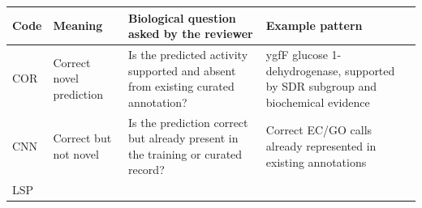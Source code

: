 \documentclass[
  11pt,
]{article}
\begin{document}
\begin{longtable}[]{@{}llll@{}}
\toprule
\begin{minipage}[b]{0.22\columnwidth}\raggedright
Code\strut
\end{minipage} & \begin{minipage}[b]{0.22\columnwidth}\raggedright
Meaning\strut
\end{minipage} & \begin{minipage}[b]{0.22\columnwidth}\raggedright
Biological question asked by the reviewer\strut
\end{minipage} & \begin{minipage}[b]{0.22\columnwidth}\raggedright
Example pattern\strut
\end{minipage}\tabularnewline
\midrule
\endhead
\begin{minipage}[t]{0.22\columnwidth}\raggedright
COR\strut
\end{minipage} & \begin{minipage}[t]{0.22\columnwidth}\raggedright
Correct novel prediction\strut
\end{minipage} & \begin{minipage}[t]{0.22\columnwidth}\raggedright
Is the predicted activity supported and absent from existing curated
annotation?\strut
\end{minipage} & \begin{minipage}[t]{0.22\columnwidth}\raggedright
ygfF glucose 1-dehydrogenase, supported by SDR subgroup and biochemical
evidence\strut
\end{minipage}\tabularnewline
\begin{minipage}[t]{0.22\columnwidth}\raggedright
CNN\strut
\end{minipage} & \begin{minipage}[t]{0.22\columnwidth}\raggedright
Correct but not novel\strut
\end{minipage} & \begin{minipage}[t]{0.22\columnwidth}\raggedright
Is the prediction correct but already present in the training or curated
record?\strut
\end{minipage} & \begin{minipage}[t]{0.22\columnwidth}\raggedright
Correct EC/GO calls already represented in existing annotations\strut
\end{minipage}\tabularnewline
\begin{minipage}[t]{0.22\columnwidth}\raggedright
LSP\strut
\end{minipage} & \begin{minipage}[t]{0.22\columnwidth}\raggedright

\end{minipage}
\end{longtable}
\end{document}
